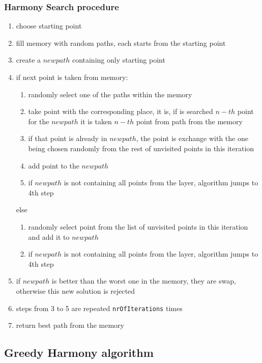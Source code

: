\documentclass[titlepage]{article}
\begin{document}
\subsubsection{Harmony Search procedure}

\begin{enumerate}
	\item choose starting point
	\item fill memory with random paths, each starts from the starting point
	\item create a $new path$ containing only starting point
	\item if next point is taken from memory:
	\begin{enumerate}[label*=\arabic*.]
		\item randomly select one of the paths within the memory
		\item take point with the corresponding place, it is, if is searched $n-th$ point for the $new path$ it is taken $n-th$ point from path from the memory
		\item if that point is already in $new path$, the point is exchange with the one being chosen randomly from the rest of unvisited points in this iteration
		\item add point to the $new path$
		\item if $new path$ is not containing all points from the layer, algorithm jumps to 4th step
	\end{enumerate}
	else
	\begin{enumerate}[label*=\arabic*.]
		\item randomly select point from the list of unvisited points in this iteration and add it to $new path$
		\item if $new path$ is not containing all points from the layer, algorithm jumps to 4th step
	\end{enumerate}
	\item if $new path$ is better than the worst one in the memory, they are swap, otherwise this new solution is rejected
	\item steps from 3 to 5 are repeated \texttt{nrOfIterations} times
	\item return best path from the memory
	
\end{enumerate}

\subsection{Greedy Harmony algorithm}
\end{document}
